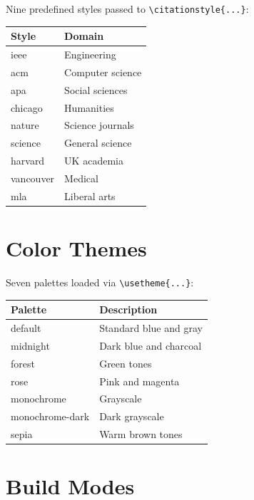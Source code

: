 Nine predefined styles passed to
\texttt{\textbackslash citationstyle\{...\}}:

\begin{table}[htbp]
  \centering
  \begin{tabular}{@{} l l @{}}
    \toprule
    \textbf{Style} & \textbf{Domain} \\
    \midrule
    ieee & Engineering \\
    acm & Computer science \\
    apa & Social sciences \\
    chicago & Humanities \\
    nature & Science journals \\
    science & General science \\
    harvard & UK academia \\
    vancouver & Medical \\
    mla & Liberal arts \\
    \bottomrule
  \end{tabular}
\end{table}

\section{Color Themes}

Seven palettes loaded via \texttt{\textbackslash usetheme\{...\}}:

\begin{table}[htbp]
  \centering
  \begin{tabular}{@{} l l @{}}
    \toprule
    \textbf{Palette} & \textbf{Description} \\
    \midrule
    default & Standard blue and gray \\
    midnight & Dark blue and charcoal \\
    forest & Green tones \\
    rose & Pink and magenta \\
    monochrome & Grayscale \\
    monochrome-dark & Dark grayscale \\
    sepia & Warm brown tones \\
    \bottomrule
  \end{tabular}
\end{table}

\section{Build Modes}

